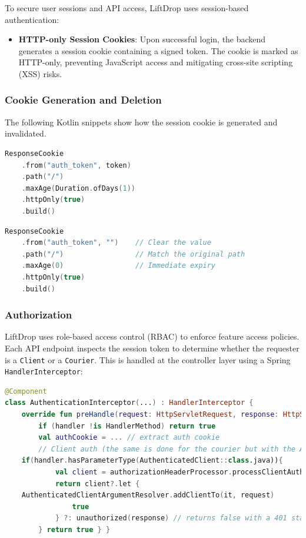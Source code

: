 To secure user sessions and API access, LiftDrop uses session-based authentication:

\begin{itemize}
    \item \textbf{HTTP-only Session Cookies}: Upon successful login, the backend generates a session cookie containing a signed token. The cookie is marked as HTTP-only, preventing JavaScript access and mitigating cross-site scripting (XSS) risks.
\end{itemize}

\subsubsection{Cookie Generation and Deletion}

The following Kotlin snippets show how the session cookie is generated and invalidated.

\begin{lstlisting}[language=Kotlin, caption={Generating the Session Cookie}]
ResponseCookie
    .from("auth_token", token)
    .path("/")
    .maxAge(Duration.ofDays(1))
    .httpOnly(true)
    .build()
\end{lstlisting}

\begin{lstlisting}[language=Kotlin, caption={Deleting the Session Cookie}]
ResponseCookie
    .from("auth_token", "")    // Clear the value
    .path("/")                 // Match the original path
    .maxAge(0)                 // Immediate expiry
    .httpOnly(true)
    .build()
\end{lstlisting}

\subsubsection{Authorization}

LiftDrop uses role-based access control (RBAC) to enforce feature access policies. Each API endpoint inspects the session token to determine whether the requester is a \texttt{Client} or a \texttt{Courier}. This is handled at the controller layer using a Spring \texttt{HandlerInterceptor}:

\begin{lstlisting}[language=Kotlin, caption={Condensed Kotlin-style pseudocode for AuthenticationInterceptor}]
@Component
class AuthenticationInterceptor(...) : HandlerInterceptor {
    override fun preHandle(request: HttpServletRequest, response: HttpServletResponse, handler: Any): Boolean {
        if (handler !is HandlerMethod) return true
        val authCookie = ... // extract auth cookie
        // Client auth (the same is done for the courier but with the AuthenticatedCourier class)
    if(handler.hasParameterType(AuthenticatedClient::class.java)){
            val client = authorizationHeaderProcessor.processClientAuthorizationHeaderValue(authCookie?.value)
            return client?.let {
    AuthenticatedClientArgumentResolver.addClientTo(it, request)
                true
            } ?: unauthorized(response) // returns false with a 401 status code
        } return true } }
\end{lstlisting}

